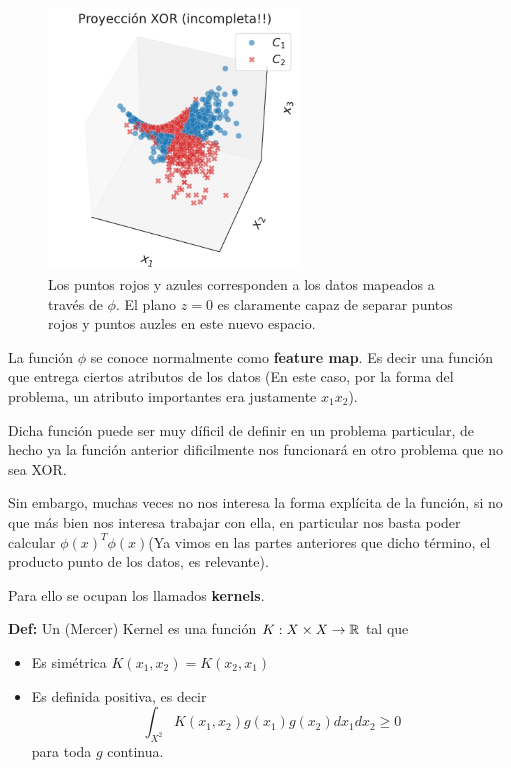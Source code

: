 \begin{figure}[ht]
    \centering
    \includegraphics[width=0.6\textwidth]{img/cap5_xor_3d_proyeccion}
    \caption{Los puntos rojos y azules corresponden a los datos mapeados a través de $\phi$. El plano $z=0$ es claramente capaz de separar puntos rojos y puntos auzles en este nuevo espacio.}
    \label{fig:my_label6}
\end{figure}


La función $\phi$ se conoce normalmente como \textbf{feature map}. Es decir una función que entrega ciertos atributos de los datos (En este caso, por la forma del problema, un atributo importantes era justamente $x_1x_2$).

Dicha función puede ser muy díficil de definir en un problema particular, de hecho ya la función anterior dificilmente nos funcionará en otro problema que no sea XOR. 

Sin embargo, muchas veces no nos interesa la forma explícita de la función, si no que más bien nos interesa trabajar con ella, en particular nos basta poder calcular $\phi(x)^{T} \phi(x)$(Ya vimos en las partes anteriores que dicho término, el producto punto de los datos, es relevante). 

Para ello se ocupan los llamados \textbf{kernels}.

\textbf{Def:} Un (Mercer) Kernel es una función $K: X\times X \to {\mathbb R}$ tal que
\begin{itemize}
    \item Es simétrica $K(x_1 , x_2 ) = K (x_2 , x_1)$
    \item Es definida positiva, es decir
    $$\int_{X^2} K(x_1, x_2)g(x_1) g(x_2) dx_1 dx_2\geq 0$$
    para toda $g$ continua. 
\end{itemize}

